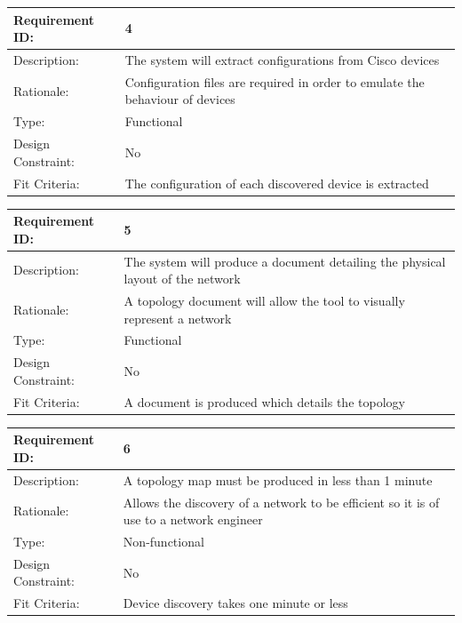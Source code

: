 \documentclass[11pt]{report}
\begin{document}
\newline
\vspace*{0.5 cm}
\newline
\begin{tabular}{|l|p{12cm}|}
	\hline Requirement ID: & 4 \\ 
	\hline Description: & The system will extract configurations from Cisco devices \\ 
	\hline Rationale: & Configuration files are required in order to emulate the behaviour of devices \\ 
	\hline Type: & Functional \\ 
	\hline Design Constraint: & No \\ 
	\hline Fit Criteria: & The configuration of each discovered device is extracted \\ 
	\hline 
\end{tabular}
\newline
\vspace*{0.5 cm}
\newline
\begin{tabular}{|l|p{12cm}|}
	\hline Requirement ID: & 5 \\ 
	\hline Description: & The system will produce a document detailing the physical layout of the network \\ 
	\hline Rationale: & A topology document will allow the tool to visually represent a network \\ 
	\hline Type: & Functional \\ 
	\hline Design Constraint: & No \\ 
	\hline Fit Criteria: & A document is produced which details the topology \\ 
	\hline 
\end{tabular}
\newline
\vspace*{0.5 cm}
\newline
\begin{tabular}{|l|p{12cm}|}
	\hline Requirement ID: & 6 \\ 
	\hline Description: & A topology map must be produced in less than 1 minute \\ 
	\hline Rationale: & Allows the discovery of a network to be efficient so it is of use to a network engineer \\ 
	\hline Type: & Non-functional \\ 
	\hline Design Constraint: & No \\ 
	\hline Fit Criteria: & Device discovery takes one minute or less \\ 
	\hline 
\end{tabular}
\end{document}
